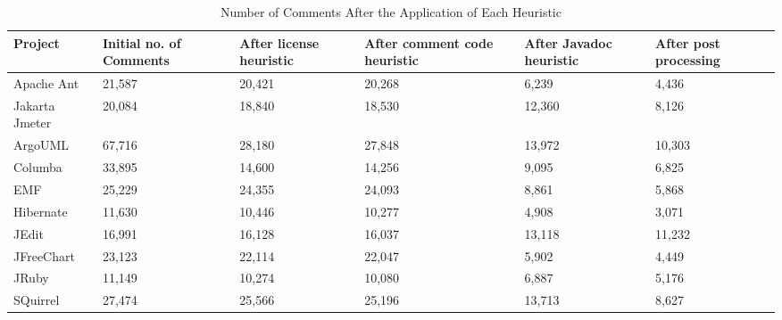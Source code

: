 \begin{table*}[!hbt]
    \begin{center}
        \caption{Number of Comments After the Application of Each Heuristic}
        \vspace{-2mm}
        \label{tab:heuristicDetails}
        \begin{tabular}{l| p{.6in} p{.6in} p{.8in} p{.7in} p{.55in}} 
            \toprule
            \textbf{Project} &  \textbf{Initial no. of Comments} & \textbf{After license heuristic} &  \textbf{After comment code heuristic}  &  \textbf{After Javadoc heuristic} & \textbf{After post processing} \\ 
            \midrule
            Apache Ant & 21,587 & 20,421 & 20,268 & 6,239 & 4,436 \\ 
            Jakarta Jmeter & 20,084& 18,840 & 18,530 & 12,360 & 8,126 \\
            ArgoUML & 67,716 & 28,180 & 27,848 & 13,972 & 10,303 \\
            Columba & 33,895 & 14,600 & 14,256 & 9,095 & 6,825 \\
            EMF & 25,229 & 24,355 & 24,093 & 8,861 & 5,868 \\
            Hibernate  & 11,630 & 10,446 & 10,277 & 4,908 & 3,071 \\
            JEdit & 16,991 & 16,128 & 16,037 & 13,118 & 11,232 \\
            JFreeChart & 23,123 & 22,114 & 22,047 & 5,902 & 4,449 \\
            JRuby & 11,149 & 10,274 & 10,080 & 6,887 & 5,176 \\
            SQuirrel  & 27,474& 25,566 & 25,196 & 13,713 & 8,627 \\  
            \bottomrule
        \end{tabular}
    \end{center}
\end{table*}
  
